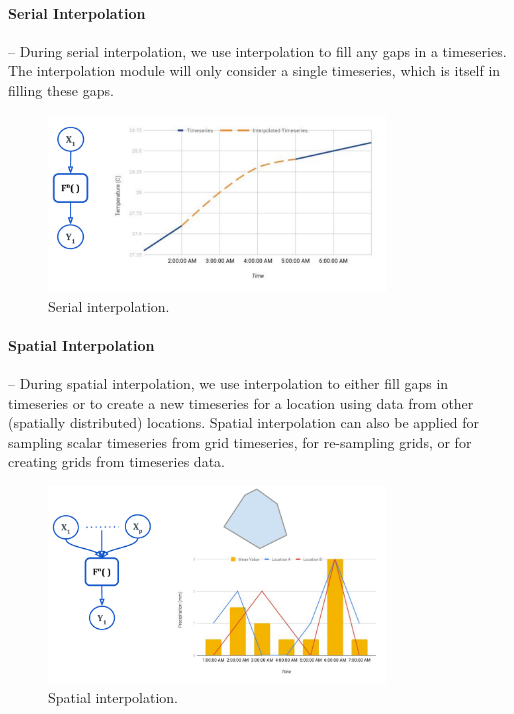 \paragraph{Serial Interpolation} -- During serial interpolation, we use interpolation to fill any gaps in a timeseries. The interpolation module will only consider a single timeseries, which is itself in filling these gaps.

\begin{figure}[htp]
    \centering
    \includegraphics[width=0.8\textwidth]{method/data_preprocess/serial_interpolation.pdf}
    \caption{Serial interpolation.}
    \label{fi:serial_interpolation}
\end{figure}

\paragraph{Spatial Interpolation} -- During spatial interpolation, we use interpolation to either fill gaps in timeseries or to create a new timeseries for a location using data from other (spatially distributed) locations. Spatial interpolation can also be applied for sampling scalar timeseries from grid timeseries, for re-sampling grids, or for creating grids from timeseries data.
\begin{figure}[htp]
    \centering
    \includegraphics[width=0.8\textwidth]{method/data_preprocess/spatial_interpolation.pdf}
    \caption{Spatial interpolation.}
    \label{fi:spatial_interpolation}
\end{figure}

